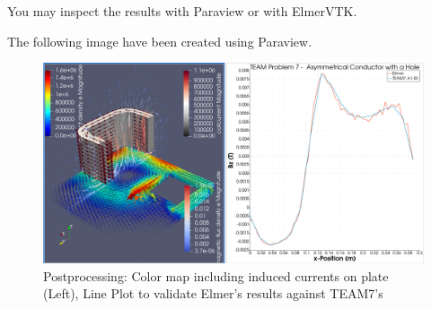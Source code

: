 You may inspect the results with Paraview or with ElmerVTK.

\noindent The following image have been created using Paraview. 

\begin{figure}[ht!]
\centering
\includegraphics[width=\textwidth]{figures/results.png}
\caption{Postprocessing: Color map including induced currents on plate (Left),  Line Plot to validate Elmer's results against TEAM7's}\label{fg:results}
\end{figure} 



\hfill
